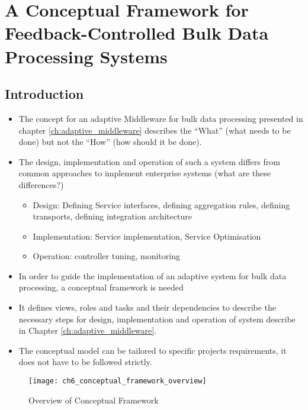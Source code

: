 

\chapter[Conceptual Framework]{A Conceptual Framework for Feedback-Controlled Bulk Data Processing Systems}\label{ch:conceptual_framework}


\section{Introduction} 

\begin{itemize}
	\item The concept for an adaptive Middleware for bulk data processing presented in chapter \ref{ch:adaptive_middleware} describes the ``What'' (what needs to be done) but not the ``How'' (how should it be done).
	\item The design, implementation and operation of such a system differs from common approaches to implement enterprise systems (what are these differences?)
	\begin{itemize}
		\item Design: Defining Service interfaces, defining aggregation rules, defining transports, defining integration architecture
		\item Implementation: Service implementation, Service Optimisation
		\item Operation: controller tuning, monitoring
	\end{itemize}
	\item In order to guide the implementation of an adaptive system for bulk data processing, a conceptual framework is needed
	\item It defines views, roles and tasks and their dependencies to describe the necessary steps for design, implementation and operation of system describe in Chapter \ref{ch:adaptive_middleware}.
	\item The conceptual model can be tailored to specific projects requirements, it does not have to be followed strictly.
\end{itemize}

\begin{figure}
	[htpb] \centering 
	\texttt{[image: ch6\_conceptual\_framework\_overview]} \caption{Overview of Conceptual Framework} \label{fig:ch6_conceptional_framework_overview} 
\end{figure}

